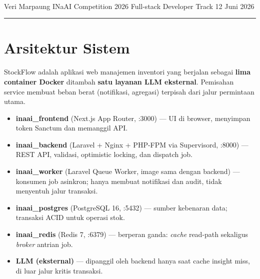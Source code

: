 \documentclass[11pt,a4paper]{article}
\begin{document}
\\[3pt]
\noindent Veri Marpaung \textbar{} INaAI Competition 2026 \textbar{} Full-stack Developer Track \textbar{} 12 Juni 2026

\vspace{4pt}
\hrule
\vspace{8pt}

\section*{Arsitektur Sistem}

StockFlow adalah aplikasi web manajemen inventori yang berjalan sebagai \textbf{lima
container Docker} ditambah \textbf{satu layanan LLM eksternal}. Pemisahan service
membuat beban berat (notifikasi, agregasi) terpisah dari jalur permintaan utama.

\begin{itemize}
  \item \textbf{inaai\_frontend} (Next.js App Router, :3000) --- UI di browser, menyimpan token Sanctum dan memanggil API.
  \item \textbf{inaai\_backend} (Laravel + Nginx + PHP-FPM via Supervisord, :8000) --- REST API, validasi, optimistic locking, dan dispatch job.
  \item \textbf{inaai\_worker} (Laravel Queue Worker, image sama dengan backend) --- konsumen job asinkron; hanya membuat notifikasi dan audit, tidak menyentuh jalur transaksi.
  \item \textbf{inaai\_postgres} (PostgreSQL 16, :5432) --- sumber kebenaran data; transaksi ACID untuk operasi stok.
  \item \textbf{inaai\_redis} (Redis 7, :6379) --- berperan ganda: \emph{cache} read-path sekaligus \emph{broker} antrian job.
  \item \textbf{LLM (eksternal)} --- dipanggil oleh backend hanya saat cache insight miss, di luar jalur kritis transaksi.
\end{itemize}
\end{document}
